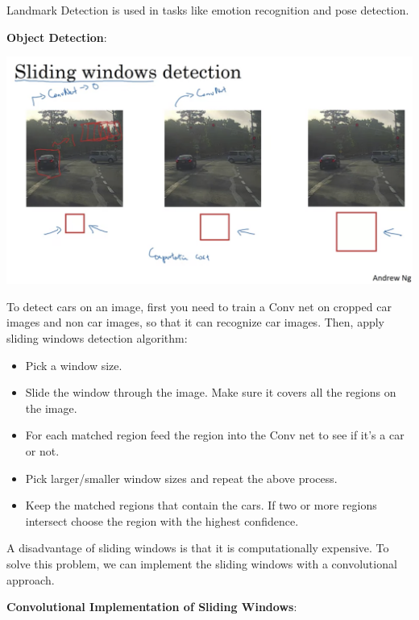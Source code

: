 \documentclass{article}
\begin{document}
\noindent Landmark Detection is used in tasks like emotion recognition and pose detection.

\bigskip

\noindent \textbf{Object Detection}:

\begin{center}
\includegraphics[scale=0.3]{./images/sliding_windows.png}
\end{center}

\noindent To detect cars on an image, first you need to train a Conv net on cropped car images and non car images, so that it can recognize car images. Then, apply sliding windows detection algorithm:

\begin{itemize}
    \item Pick a window size.
    \item Slide the window through the image. Make sure it covers all the regions on the image.
    \item For each matched region feed the region into the Conv net to see if it's a car or not.
    \item Pick larger/smaller window sizes and repeat the above process.
    \item Keep the matched regions that contain the cars. If two or more regions intersect choose the region with the highest confidence.
\end{itemize}

\noindent A disadvantage of sliding windows is that it is computationally expensive. To solve this problem, we can implement the sliding windows with a convolutional approach.

\bigskip

\noindent \textbf{Convolutional Implementation of Sliding Windows}:
\end{document}
